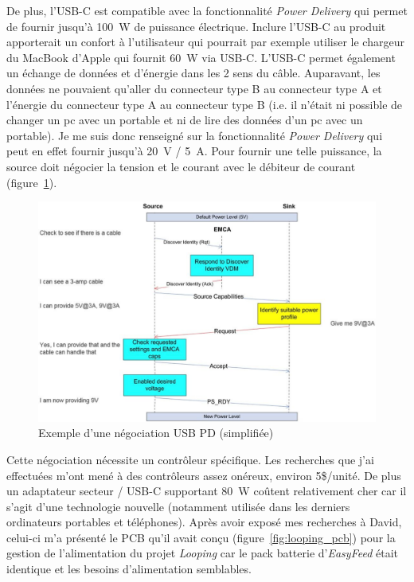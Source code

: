\documentclass[a4paper, 12pt, sffamily]{report}
\begin{document}
De plus, l’USB-C est compatible avec la fonctionnalité \emph{Power Delivery} qui permet de fournir jusqu’à \SI{100}{\watt} de puissance électrique. Inclure l’USB-C au produit apporterait un confort à l’utilisateur qui pourrait par exemple utiliser le chargeur du MacBook d’Apple qui fournit \SI{60}{\watt} via USB-C.
L'USB-C permet également un échange de données et d'énergie dans les 2 sens du câble. Auparavant, les données ne pouvaient qu'aller du connecteur type B au connecteur type A et l'énergie du connecteur type A au connecteur type B (i.e. il n'était ni possible de changer un pc avec un portable et ni de lire des données d'un pc avec un portable).
Je me suis donc renseigné sur la fonctionnalité \emph{Power Delivery} qui peut en effet fournir jusqu’à \SI{20}{\volt} / \SI{5}{\ampere}. Pour fournir une telle puissance, la source doit négocier la tension et le courant avec le débiteur de courant (figure~\ref{fig:usb_pd_negociation}).

\begin{figure}[H]
\centering
\includegraphics[scale=0.35]{figures/screenshots/usb_pd_nego.png}
\caption{Exemple d’une négociation USB PD (simplifiée) \cite{usb_pd_nego}}
\label{fig:usb_pd_negociation}
\end{figure}

Cette négociation nécessite un contrôleur spécifique. Les recherches que j’ai effectuées m’ont mené à des contrôleurs assez onéreux, environ 5\$/unité. De plus un adaptateur secteur / USB-C supportant \SI{80}{\watt} coûtent relativement cher car il s'agit d'une technologie nouvelle (notamment utilisée dans les derniers ordinateurs portables et téléphones).
Après avoir exposé mes recherches à David, celui-ci m'a présenté le PCB qu’il avait conçu (figure~\ref{fig:looping_pcb}) pour la gestion de l’alimentation du projet \emph{Looping} car le pack batterie d'\emph{EasyFeed} était identique et les besoins d'alimentation semblables.
\end{document}
